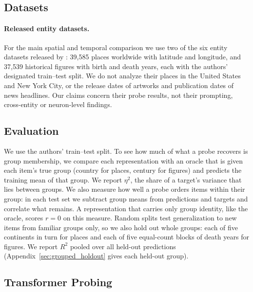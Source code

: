 \documentclass[11pt]{article}
\begin{document}
\subsection{Datasets}
\label{sec:data}

\paragraph{Released entity datasets.}
For the main spatial and temporal comparison we use two of the six entity datasets released
by \citet{gurnee2024language}: 39{,}585 places worldwide with latitude and longitude, and
37{,}539 historical figures with birth and death years, each with the authors' designated
train--test split. We do not analyze their places in the United States and New York City,
or the release dates of artworks and publication dates of news headlines. Our claims
concern their probe results, not their prompting, cross-entity or neuron-level findings.

\subsection{Evaluation}
\label{sec:protocols}

We use the authors' train--test split. To see how much of what a probe recovers is group membership, we compare each representation with an oracle that is given each item's true group (country for places, century for figures) and predicts the training mean of that group. We report $\eta^2$, the
share of a target's variance that lies between groups. We also measure how well a probe orders
items within their group: in each test set we subtract group means from predictions and targets
and correlate what remains. A representation that carries only group identity, like the oracle,
scores $r = 0$ on this measure. Random splits test generalization to new items from familiar
groups only, so we also hold out whole groups: each of five continents in turn for places and each of five equal-count blocks of death years for figures. We report $R^2$ pooled over all held-out predictions
(Appendix~\ref{sec:grouped_holdout} gives each held-out group).

\subsection{Transformer Probing}
\label{sec:llm_methods}
\end{document}
